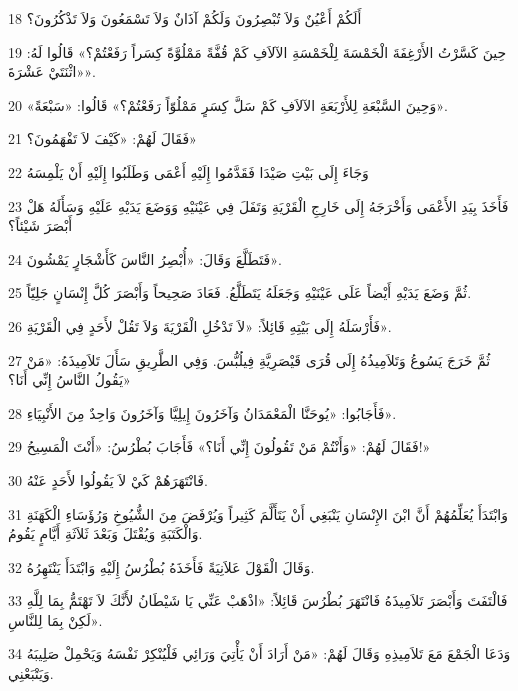 \par 18 أَلَكُمْ أَعْيُنٌ وَلاَ تُبْصِرُونَ وَلَكُمْ آذَانٌ وَلاَ تَسْمَعُونَ وَلاَ تَذْكُرُونَ؟
\par 19 حِينَ كَسَّرْتُ الأَرْغِفَةَ الْخَمْسَةَ لِلْخَمْسَةِ الآلاَفِ كَمْ قُفَّةً مَمْلُوَّةً كِسَراً رَفَعْتُمْ؟» قَالُوا لَهُ: «اثْنَتَيْ عَشْرَةَ».
\par 20 «وَحِينَ السَّبْعَةِ لِلأَرْبَعَةِ الآلاَفِ كَمْ سَلَّ كِسَرٍ مَمْلُوّاً رَفَعْتُمْ؟» قَالُوا: «سَبْعَةً».
\par 21 فَقَالَ لَهُمْ: «كَيْفَ لاَ تَفْهَمُونَ؟»
\par 22 وَجَاءَ إِلَى بَيْتِ صَيْدَا فَقَدَّمُوا إِلَيْهِ أَعْمَى وَطَلَبُوا إِلَيْهِ أَنْ يَلْمِسَهُ
\par 23 فَأَخَذَ بِيَدِ الأَعْمَى وَأَخْرَجَهُ إِلَى خَارِجِ الْقَرْيَةِ وَتَفَلَ فِي عَيْنَيْهِ وَوَضَعَ يَدَيْهِ عَلَيْهِ وَسَأَلَهُ هَلْ أَبْصَرَ شَيْئاً؟
\par 24 فَتَطَلَّعَ وَقَالَ: «أُبْصِرُ النَّاسَ كَأَشْجَارٍ يَمْشُونَ».
\par 25 ثُمَّ وَضَعَ يَدَيْهِ أَيْضاً عَلَى عَيْنَيْهِ وَجَعَلَهُ يَتَطَلَّعُ. فَعَادَ صَحِيحاً وَأَبْصَرَ كُلَّ إِنْسَانٍ جَلِيّاً.
\par 26 فَأَرْسَلَهُ إِلَى بَيْتِهِ قَائِلاً: «لاَ تَدْخُلِ الْقَرْيَةَ وَلاَ تَقُلْ لأَحَدٍ فِي الْقَرْيَةِ».
\par 27 ثُمَّ خَرَجَ يَسُوعُ وَتَلاَمِيذُهُ إِلَى قُرَى قَيْصَرِيَّةِ فِيلُبُّسَ. وَفِي الطَّرِيقِ سَأَلَ تَلاَمِيذَهُ: «مَنْ يَقُولُ النَّاسُ إِنِّي أَنَا؟»
\par 28 فَأَجَابُوا: «يُوحَنَّا الْمَعْمَدَانُ وَآخَرُونَ إِيلِيَّا وَآخَرُونَ وَاحِدٌ مِنَ الأَنْبِيَاءِ».
\par 29 فَقَالَ لَهُمْ: «وَأَنْتُمْ مَنْ تَقُولُونَ إِنِّي أَنَا؟» فَأَجَابَ بُطْرُسُ: «أَنْتَ الْمَسِيحُ!»
\par 30 فَانْتَهَرَهُمْ كَيْ لاَ يَقُولُوا لأَحَدٍ عَنْهُ.
\par 31 وَابْتَدَأَ يُعَلِّمُهُمْ أَنَّ ابْنَ الإِنْسَانِ يَنْبَغِي أَنْ يَتَأَلَّمَ كَثِيراً وَيُرْفَضَ مِنَ الشُّيُوخِ وَرُؤَسَاءِ الْكَهَنَةِ وَالْكَتَبَةِ وَيُقْتَلَ وَبَعْدَ ثَلاَثَةِ أَيَّامٍ يَقُومُ.
\par 32 وَقَالَ الْقَوْلَ عَلاَنِيَةً فَأَخَذَهُ بُطْرُسُ إِلَيْهِ وَابْتَدَأَ يَنْتَهِرُهُ.
\par 33 فَالْتَفَتَ وَأَبْصَرَ تَلاَمِيذَهُ فَانْتَهَرَ بُطْرُسَ قَائِلاً: «اذْهَبْ عَنِّي يَا شَيْطَانُ لأَنَّكَ لاَ تَهْتَمُّ بِمَا لِلَّهِ لَكِنْ بِمَا لِلنَّاسِ».
\par 34 وَدَعَا الْجَمْعَ مَعَ تَلاَمِيذِهِ وَقَالَ لَهُمْ: «مَنْ أَرَادَ أَنْ يَأْتِيَ وَرَائِي فَلْيُنْكِرْ نَفْسَهُ وَيَحْمِلْ صَلِيبَهُ وَيَتْبَعْنِي.
